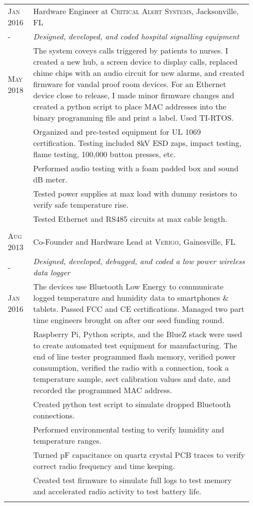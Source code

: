 \documentclass[a4paper,10pt]{article} %
\begin{document}
\begin{tabular}{p{1.5cm}|p{12.5cm}}


\centering\textsc{Jan 2016} &  Hardware Engineer at \textsc{Critical Alert Systems}, Jacksonville, FL \\
\centering - & \emph{Designed, developed, and coded hospital signalling equipment}\\
\centering\textsc{May 2018} & \footnotesize{The system coveys calls triggered by patients to nurses. I created a new hub, a screen device to display calls, replaced chime chips with an audio circuit for new alarms, and created firmware for vandal proof room devices. For an Ethernet device close to release, I made minor firmware changes and created a python script to place MAC addresses into the binary programming file and print a label. Used TI-RTOS.}\\
&\footnotesize{Organized and pre-tested equipment for UL 1069 certification. Testing included 8kV ESD zaps, impact testing, flame testing, 100,000 button presses, etc.}\\
&\footnotesize{Performed audio testing with a foam padded box and sound dB meter.}\\
&\footnotesize{Tested power supplies at max load with dummy resistors to verify safe temperature rise.}\\
&\footnotesize{Tested Ethernet and RS485 circuits at max cable length.}\\
\multicolumn{2}{c}{} \\

\centering\textsc{Aug 2013} &  Co-Founder and Hardware Lead at \textsc{Verigo}, Gainesville, FL \\
\centering\textsc{-}& \emph{Designed, developed, debugged, and coded a low power wireless data logger }\\
\centering\textsc{Jan 2016}&\footnotesize{The devices use Bluetooth Low Energy to communicate logged temperature and humidity data to smartphones \& tablets. Passed FCC and CE certifications. Managed two part time engineers brought on after our seed funding round. }\\
&\footnotesize{Raspberry Pi, Python scripts, and the BlueZ stack were used to create automated test equipment for manufacturing. The end of line tester programmed flash memory, verified power consumption, verified the radio with a connection, took a temperature sample, sect calibration values and date, and recorded the programmed MAC address.}\\
&\footnotesize{Created python test script to simulate dropped Bluetooth connections.}\\
&\footnotesize{Performed environmental testing to verify humidity and temperature ranges.}\\
&\footnotesize{Turned pF capacitance on quartz crystal PCB traces to verify correct radio frequency and time keeping.}\\
&\footnotesize{Created test firmware to simulate full logs to test memory and accelerated radio activity to test battery life.}\\
\multicolumn{2}{c}{} \\


\end{tabular}
\end{document}
